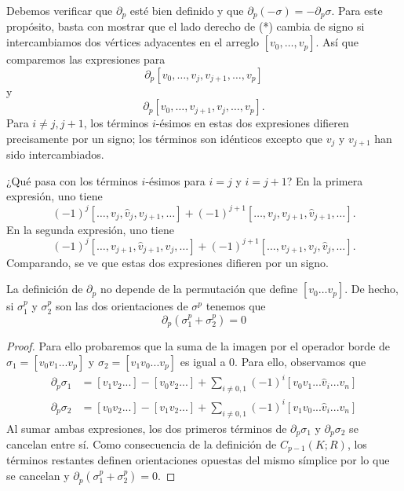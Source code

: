 Debemos verificar que \(\partial_p\) esté bien definido y que \(\partial_p(-\sigma) = -\partial_p \sigma\). Para este propósito, basta con mostrar que el lado derecho de (*) cambia de signo si intercambiamos dos vértices adyacentes en el arreglo \([v_0, \ldots, v_p]\). Así que comparemos las expresiones para
\[
\partial_p[v_0, \ldots, v_j, v_{j+1}, \ldots, v_p]
\]
y
\[
\partial_p[v_0, \ldots, v_{j+1}, v_j, \ldots, v_p].
\]
Para \(i \neq j, j+1\), los términos \(i\)-ésimos en estas dos expresiones difieren precisamente por un signo; los términos son idénticos excepto que \(v_j\) y \(v_{j+1}\) han sido intercambiados.

¿Qué pasa con los términos \(i\)-ésimos para \(i = j\) y \(i = j + 1\)? En la primera expresión, uno tiene
\[
(-1)^j[\ldots, v_j, \hat{v}_{j}, v_{j+1}, \ldots] + (-1)^{j+1}[\ldots, v_j, v_{j+1}, \hat{v}_{j+1}, \ldots].
\]
En la segunda expresión, uno tiene
\[
(-1)^j[\ldots, v_{j+1}, \hat{v}_{j+1}, v_j, \ldots] + (-1)^{j+1}[\ldots, v_{j+1}, v_j, \hat{v}_j, \ldots].
\]
Comparando, se ve que estas dos expresiones difieren por un signo.

\begin{lema}
	La definición de $\partial_p$ no depende de la permutación que define $[v_0 \dots v_p]$. De hecho, si $\sigma^p_1$ y $\sigma^p_2$ son las dos orientaciones de $\sigma^p$ tenemos que
	\[ \partial_p(\sigma^p_1+\sigma^p_2) = 0 \]
\end{lema}
\begin{proof}
	Para ello probaremos que la suma de la imagen por el operador borde de $\sigma_{1} = [v_{0}v_{1}...v_{p}]$ y $\sigma_{2} = [v_{1}v_{0}...v_{p}]$ es igual a $0$.
	Para ello, observamos que
	\begin{align*}
		\partial_{p}\sigma_{1} &= [v_{1}v_{2}...] - [v_{0}v_{2}...] + \sum_{i\ne0,1}(-1)^{i}[v_{0}v_{1}...\hat{v}_{i}...v_{n}]\\
		\partial_{p}\sigma_{2} &= [v_{0}v_{2}...] - [v_{1}v_{2}...] + \sum_{i\ne0,1}(-1)^{i}[v_{1}v_{0}...\hat{v}_{i}...v_{n}]
	\end{align*}
	Al sumar ambas expresiones, los dos primeros términos de $\partial_{p}\sigma_{1}$ y $\partial_{p}\sigma_{2}$ se cancelan entre sí. Como consecuencia de la definición de $C_{p-1}(K;R)$, los términos restantes definen orientaciones opuestas del mismo símplice por lo que se cancelan y $\partial_{p}(\sigma_{1}^{p}+\sigma_{2}^{p})=0$.
\end{proof}

